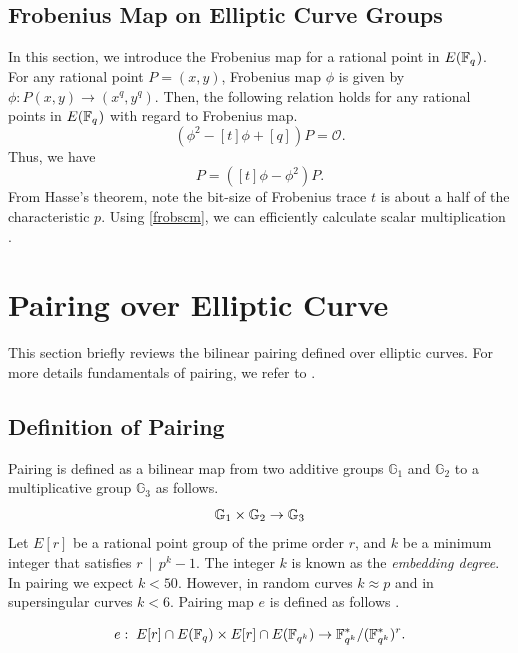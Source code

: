 \subsection{Frobenius Map on Elliptic Curve Groups}
In this section, we introduce the Frobenius map for a rational point in $E({\mathbb{F}}_{q^{}})$.
For any rational point $P=(x, y)$, Frobenius map $\phi$ is given by $\phi:P(x, y) \rightarrow ({x}^q, {y}^q)$.
Then, the following relation holds for any rational points in $E({\mathbb{F}}_{q^{}})$ with regard to Frobenius map.
\begin{equation*}
\left(\phi^{2}-[t]\phi+[q]\right)P=\mathcal{O}.
\end{equation*}
Thus, we have
\begin{equation}
[q]P=\left([t]\phi-\phi^2\right)P. \label{frobscm}
\end{equation}
From Hasse's theorem, note the bit-size of Frobenius trace $t$ is about a half of the characteristic $p$. 
Using \eqref{frobscm}, we can efficiently calculate scalar multiplication \cite{C:Koblitz91}.


\section{Pairing over Elliptic Curve}
This section briefly reviews the bilinear pairing defined over elliptic curves.
For more details fundamentals of pairing, we refer to \cite{book_GPCMrabet2016}.

\subsection{Definition of Pairing} \label{secDefPairing} 
Pairing is defined as a bilinear map from two additive groups $\mathbb{G}_1$ and $\mathbb{G}_2$ to a multiplicative group $\mathbb{G}_3$ as follows.
\begin{equation}
\mathbb{G}_1 \times {\mathbb{G}}_{2} \rightarrow {\mathbb{G}}_{3} \nonumber
\end{equation}
Let $E[r]$ be a rational point group of the prime order $r$, and $k$ be a minimum integer that satisfies $r\,\mid \,p^k-1$.
The integer $k$ is known as the {\it embedding degree}. 
In pairing we expect $k<50$. 
However, in random curves $k\approx p$ and in supersingular curves $k<6$.
Pairing map $e$ is defined as follows \cite{PAIRING:Hess08}.

\begin{equation}
e:\;E[r]\cap E({\mathbb{F}}_{q}) \times E[r]\cap E({\mathbb{F}}_{q^{k}}) \rightarrow {\mathbb{F}}_{q^{k}} ^*/({\mathbb{F}}_{q^{k}} ^*)^r. \label{pairingdef}
\end{equation}

